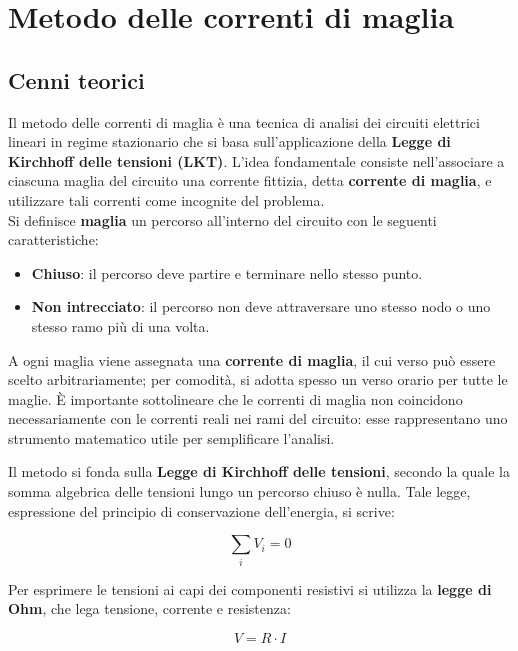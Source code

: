 \chapter{Metodo delle correnti di maglia}

\section{Cenni teorici}

Il metodo delle correnti di maglia è una tecnica di analisi dei circuiti elettrici lineari in regime stazionario che si basa sull'applicazione della \textbf{Legge di Kirchhoff delle tensioni (LKT)}.  
L'idea fondamentale consiste nell'associare a ciascuna maglia del circuito una corrente fittizia, detta \textbf{corrente di maglia}, e utilizzare tali correnti come incognite del problema.\\

Si definisce \textbf{maglia} un percorso all'interno del circuito con le seguenti caratteristiche:
\begin{itemize}
    \item \textbf{Chiuso}: il percorso deve partire e terminare nello stesso punto.
    \item \textbf{Non intrecciato}: il percorso non deve attraversare uno stesso nodo o uno stesso ramo più di una volta.
\end{itemize}

A ogni maglia viene assegnata una \textbf{corrente di maglia}, il cui verso può essere scelto arbitrariamente; per comodità, si adotta spesso un verso orario per tutte le maglie. È importante sottolineare che le correnti di maglia non coincidono necessariamente con le correnti reali nei rami del circuito: esse rappresentano uno strumento matematico utile per semplificare l'analisi.

Il metodo si fonda sulla \textbf{Legge di Kirchhoff delle tensioni}, secondo la quale la somma algebrica delle tensioni lungo un percorso chiuso è nulla. Tale legge, espressione del principio di conservazione dell'energia, si scrive:

\begin{equation}
\sum_{i} V_i = 0
\label{eq:LKT}
\end{equation}

Per esprimere le tensioni ai capi dei componenti resistivi si utilizza la \textbf{legge di Ohm}, che lega tensione, corrente e resistenza:

\begin{equation}
V = R \cdot I
\label{eq:ohm}
\end{equation}

